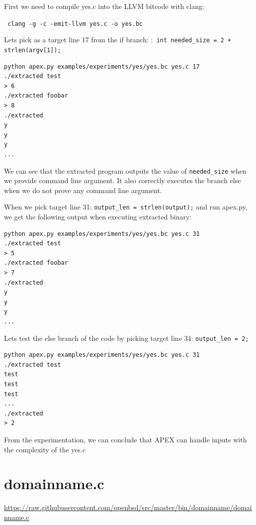 \documentclass[12pt, twoside]{fithesis2}
\renewcommand{\_}{\leavevmode \kern0.07em\vbox{\hrule width0.4em}}
\begin{document}
First we need to compile yes.c into the LLVM bitcode with clang:

\texttt{
clang -g -c -emit-llvm yes.c -o yes.bc
}

Lets pick as a target line 17 from the if branch:
:\texttt{
int needed_size = 2 + strlen(argv[1]);
}

\begin{verbatim}
python apex.py examples/experiments/yes/yes.bc yes.c 17
./extracted test
> 6
./extracted foobar
> 8
./extracted
y
y
y
...
\end{verbatim}

We can see that the extracted program outputs the value of
\texttt{needed_size} when we provide command line argument.
It also correctly executes the branch else when we do not prove any command line
argument.

When we pick target line 31: \texttt{output_len = strlen(output);}
and run apex.py, we get the following output when executing extracted binary:

\begin{verbatim}
python apex.py examples/experiments/yes/yes.bc yes.c 31
./extracted test
> 5
./extracted foobar
> 7
./extracted
y
y
y
...
\end{verbatim}

Lets test the else branch of the code by picking target line 34:
\texttt{output_len = 2;}

\begin{verbatim}
python apex.py examples/experiments/yes/yes.bc yes.c 31
./extracted test
test
test
test
...
./extracted
> 2
\end{verbatim}

From the experimentation, we can conclude that APEX can handle inputs with the
complexity of the yes.c


\section{domainname.c}
\label{sec:exp_domainname}

\url{https://raw.githubusercontent.com/openbsd/src/master/bin/domainname/domainname.c}


\begin{verbatim}

\end{verbatim}
\end{document}
